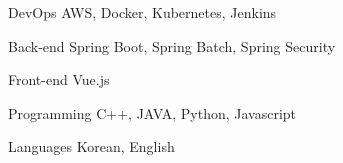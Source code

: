 

\begin{cvskills}

  \cvskill
    {DevOps} %
    {AWS, Docker, Kubernetes, Jenkins} %

  \cvskill
    {Back-end} %
    {Spring Boot, Spring Batch, Spring Security} %

  \cvskill
    {Front-end} %
    {Vue.js} %

  \cvskill
    {Programming} %
    {C++, JAVA, Python, Javascript} %

  \cvskill
    {Languages} %
    {Korean, English} %

\end{cvskills}
